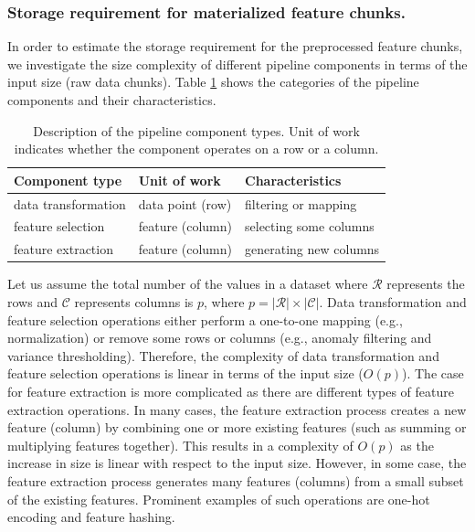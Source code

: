 \subsubsection{Storage requirement for materialized feature chunks.} 
In order to estimate the storage requirement for the preprocessed feature chunks, we investigate the size complexity of different pipeline components in terms of the input size (raw data chunks).
Table \ref{pipeline-component-description} shows the categories of the pipeline components and their characteristics.
\begin{table}[h!]
\centering
\begin{tabular}{lll}
\hline
\textbf{Component type}  & \textbf{Unit of work} &\textbf{Characteristics}  \\
\hline
data transformation			& data point (row)       	  & filtering or mapping        \\
feature selection            & feature (column)             & selecting some columns\\
feature extraction & feature (column) & generating new columns \\
\hline
\end{tabular}
\caption{Description of the pipeline component types. Unit of work indicates whether the component operates on a row or a column.}  
 \vspace{-32pt}
\label{pipeline-component-description}
\end{table}
Let us assume the total number of the values in a dataset where $\mathcal{R}$ represents the rows and $\mathcal{C}$ represents columns is $p$, where $p = |\mathcal{R}| \times |\mathcal{C}|$.
Data transformation and feature selection operations either perform a one-to-one mapping (e.g., normalization) or remove some rows or columns (e.g., anomaly filtering and variance thresholding).
Therefore, the complexity of data transformation and feature selection operations is linear in terms of the input size ($O(p)$).
The case for feature extraction is more complicated as there are different types of feature extraction operations.
In many cases, the feature extraction process creates a new feature (column) by combining one or more existing features (such as summing or multiplying features together).
This results in a complexity of $O(p)$ as the increase in size is linear with respect to the input size.
However, in some case, the feature extraction process generates many features (columns) from a small subset of the existing features.
Prominent examples of such operations are one-hot encoding and feature hashing.
